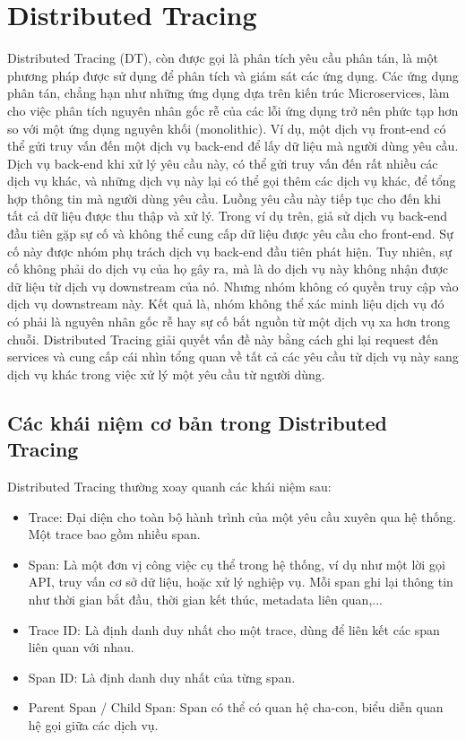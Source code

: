 \documentclass{uetgraduation}
\begin{document}
\section{Distributed Tracing}
Distributed Tracing (DT), còn được gọi là phân tích yêu cầu phân tán, là một phương pháp được sử dụng để phân tích và giám sát các ứng dụng. Các ứng dụng phân tán, chẳng hạn như những ứng dụng dựa trên kiến trúc Microservices, làm cho việc phân tích nguyên nhân gốc rễ của các lỗi ứng dụng trở nên phức tạp hơn so với một ứng dụng nguyên khối (monolithic). Ví dụ, một dịch vụ front-end có thể gửi truy vấn đến một dịch vụ back-end để lấy dữ liệu mà người dùng yêu cầu. Dịch vụ back-end khi xử lý yêu cầu này, có thể gửi truy vấn đến rất nhiều các dịch vụ khác, và những dịch vụ này lại có thể gọi thêm các dịch vụ khác, để tổng hợp thông tin mà người dùng yêu cầu. Luồng yêu cầu này tiếp tục cho đến khi tất cả dữ liệu được thu thập và xử lý. Trong ví dụ trên, giả sử dịch vụ back-end đầu tiên gặp sự cố và không thể cung cấp dữ liệu được yêu cầu cho front-end. Sự cố này được nhóm phụ trách dịch vụ back-end đầu tiên phát hiện. Tuy nhiên, sự cố không phải do dịch vụ của họ gây ra, mà là do dịch vụ này không nhận được dữ liệu từ dịch vụ downstream của nó. Nhưng nhóm không có quyền truy cập vào dịch vụ downstream này. Kết quả là, nhóm không thể xác minh liệu dịch vụ đó có phải là nguyên nhân gốc rễ hay sự cố bắt nguồn từ một dịch vụ xa hơn trong chuỗi. Distributed Tracing giải quyết vấn đề này bằng cách ghi lại request đến services và cung cấp cái nhìn tổng quan về tất cả các yêu cầu từ dịch vụ này sang dịch vụ khác trong việc xử lý một yêu cầu từ người dùng.

\subsection{Các khái niệm cơ bản trong Distributed Tracing}
Distributed Tracing thường xoay quanh các khái niệm sau:
\begin{itemize}
    \item Trace: Đại diện cho toàn bộ hành trình của một yêu cầu xuyên qua hệ thống. Một trace bao gồm nhiều span.
    \item Span: Là một đơn vị công việc cụ thể trong hệ thống, ví dụ như một lời gọi API, truy vấn cơ sở dữ liệu, hoặc xử lý nghiệp vụ. Mỗi span ghi lại thông tin như thời gian bắt đầu, thời gian kết thúc, metadata liên quan,...
    \item Trace ID: Là định danh duy nhất cho một trace, dùng để liên kết các span liên quan với nhau.
    \item Span ID: Là định danh duy nhất của từng span.
    \item Parent Span / Child Span: Span có thể có quan hệ cha-con, biểu diễn quan hệ gọi giữa các dịch vụ.
\end{itemize}
\end{document}
